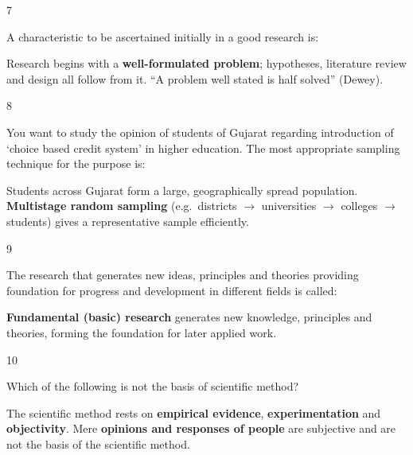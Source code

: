 \begin{question}{7}
{A characteristic to be ascertained initially in a good research is:\par}
\begin{explain}
Research begins with a \textbf{well-formulated problem}; hypotheses, literature review and design all follow from it. ``A problem well stated is half solved'' (Dewey).
\end{explain}
\end{question}

\begin{question}{8}
{You want to study the opinion of students of Gujarat regarding introduction of `choice based credit system' in higher education. The most appropriate sampling technique for the purpose is:\par}
\begin{explain}
Students across Gujarat form a large, geographically spread population. \textbf{Multistage random sampling} (e.g.\ districts $\rightarrow$ universities $\rightarrow$ colleges $\rightarrow$ students) gives a representative sample efficiently.
\end{explain}
\end{question}

\begin{question}{9}
{The research that generates new ideas, principles and theories providing foundation for progress and development in different fields is called:\par}
\begin{explain}
\textbf{Fundamental (basic) research} generates new knowledge, principles and theories, forming the foundation for later applied work.
\end{explain}
\end{question}

\begin{question}{10}
{Which of the following is not the basis of scientific method?\par}
\begin{explain}
The scientific method rests on \textbf{empirical evidence}, \textbf{experimentation} and \textbf{objectivity}. Mere \textbf{opinions and responses of people} are subjective and are not the basis of the scientific method.
\end{explain}
\end{question}

